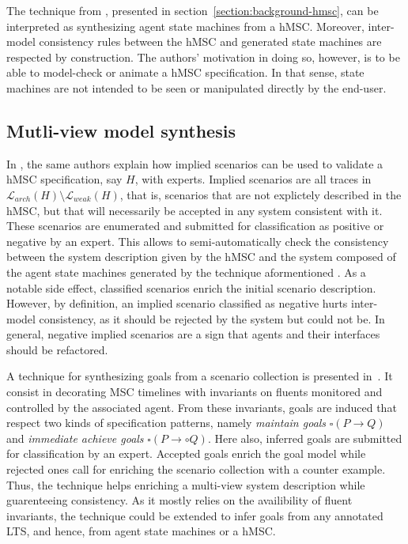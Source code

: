 The technique from \cite{Uchitel:2003}, presented in section~\ref{section:background-hmsc}, can be interpreted as synthesizing agent state machines from a hMSC. Moreover, inter-model consistency rules between the hMSC and generated state machines are respected by construction. The authors' motivation in doing so, however, is to be able to model-check or animate a hMSC specification. In that sense, state machines are not intended to be seen or manipulated directly by the end-user.

\subsection*{Mutli-view model synthesis}

In \cite{Uchitel:2004}, the same authors explain how implied scenarios can be used to validate a hMSC specification, say $H$, with experts. Implied scenarios are all traces in $\mathcal{L}_{arch}(H) \setminus \mathcal{L}_{weak}(H)$, that is, scenarios that are not explictely described in the hMSC, but that will necessarily be accepted in any system consistent with it. These scenarios are enumerated and submitted for classification as positive or negative by an expert. This allows to semi-automatically check the consistency between the system description given by the hMSC and the system composed of the agent state machines generated by the technique aformentioned \cite{Uchitel:2003}. As a notable side effect, classified scenarios enrich the initial scenario description. However, by definition, an implied scenario classified as negative hurts inter-model consistency, as it should be rejected by the system but could not be. In general, negative implied scenarios are a sign that agents and their interfaces should be refactored. 

A technique for synthesizing goals from a scenario collection is presented in~\cite{Damas:2006}. It consist in decorating MSC timelines with invariants on fluents monitored and controlled by the associated agent. From these invariants, goals are induced that respect two kinds of specification patterns, namely \emph{maintain goals} $\square(P \rightarrow Q)$ and \emph{immediate achieve goals} $\square(P \rightarrow \circ Q)$. Here also, inferred goals are submitted for classification by an expert. Accepted goals enrich the goal model while rejected ones call for enriching the scenario collection with a counter example. Thus, the technique helps enriching a multi-view system description while guarenteeing consistency. As it mostly relies on the availibility of fluent invariants, the technique could be extended to infer goals from any annotated LTS, and hence, from agent state machines or a hMSC. 
